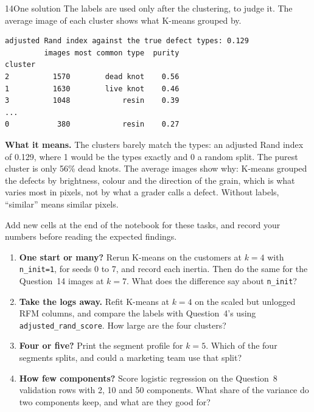 \begin{labquestion}{14}{One solution}
The labels are used only after the clustering, to judge it. The average image of each cluster shows what K-means grouped by.
\end{labquestion}
\begin{labanswer}

\begin{refoutput}
\begin{lstlisting}[style=utpterminal]
adjusted Rand index against the true defect types: 0.129
         images most common type  purity
cluster
2          1570        dead knot    0.56
1          1630        live knot    0.46
3          1048            resin    0.39
...
0           380            resin    0.27
\end{lstlisting}
\end{refoutput}

\textbf{What it means.} The clusters barely match the types: an adjusted Rand index of 0.129, where 1 would be the types exactly and 0 a random split. The purest cluster is only 56\% dead knots. The average images show why: K-means grouped the defects by brightness, colour and the direction of the grain, which is what varies most in pixels, not by what a grader calls a defect. Without labels, ``similar'' means similar pixels.
\end{labanswer}


\begin{yourturn}
Add new cells at the end of the notebook for these tasks, and record your numbers before reading the expected findings.
\begin{enumerate}
  \item \textbf{One start or many?} Rerun K-means on the customers at $k=4$ with \texttt{n\_init=1}, for seeds 0 to 7, and record each inertia. Then do the same for the Question~14 images at $k=7$. What does the difference say about \texttt{n\_init}?
  \item \textbf{Take the logs away.} Refit K-means at $k=4$ on the scaled but unlogged RFM columns, and compare the labels with Question~4's using \texttt{adjusted\_rand\_score}. How large are the four clusters?
  \item \textbf{Four or five?} Print the segment profile for $k=5$. Which of the four segments splits, and could a marketing team use that split?
  \item \textbf{How few components?} Score logistic regression on the Question~8 validation rows with 2, 10 and 50 components. What share of the variance do two components keep, and what are they good for?
\end{enumerate}
\end{yourturn}

